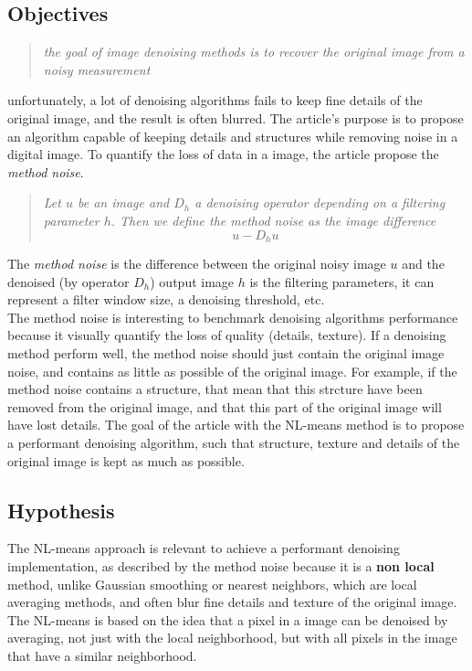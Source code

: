 \documentclass[a4paper, twocolumn, twoside]{article}
\begin{document}
\subsection{Objectives}
\begin{quote}
	\textit{the goal of image denoising methods is to recover the original image from a noisy measurement} \cite{nlmeans}
\end{quote}
unfortunately, a lot of denoising algorithms fails to keep fine details of the original image, and the result is often blurred.
The article's purpose is to propose an algorithm capable of keeping details and structures while removing noise in a digital image.
To quantify the loss of data in a image, the article propose the \textit{method noise}.
\begin{quote}
	\textit{Let $u$ be an image and $D_h$ a denoising operator depending on a filtering parameter $h$.
	Then we define the method noise as the image difference} \cite{nlmeans}
	$$
	u - D_hu
	$$
\end{quote}
The \textit{method noise} is the difference between the original noisy image $u$ and the 
denoised (by operator $D_h$) output image
$h$ is the filtering parameters, it can represent a filter window size, a denoising threshold, etc.\\
The method noise is interesting to benchmark denoising algorithms performance because it visually quantify the loss 
of quality (details, texture).
If a denoising method perform well, the method noise should just contain the original image noise, 
and contains as little as possible of the original image. For example, if the method noise contains a structure,
that mean that this strcture have been removed from the original image, and that this part of the original image will have lost details.
The goal of the article with the NL-means method is to propose a performant denoising algorithm, such that structure, texture and details
of the original image is kept as much as possible.
\subsection{Hypothesis}
The NL-means approach is relevant to achieve a performant denoising implementation, as described by the method noise
because it is a \textbf{non local} method, unlike Gaussian smoothing or nearest neighbors, which are local averaging methods,
and often blur fine details and texture of the original image.
The NL-means is based on the idea that a pixel in a image can be denoised by averaging, not just with the local neighborhood, but with
all pixels in the image that have a similar neighborhood.
\end{document}
